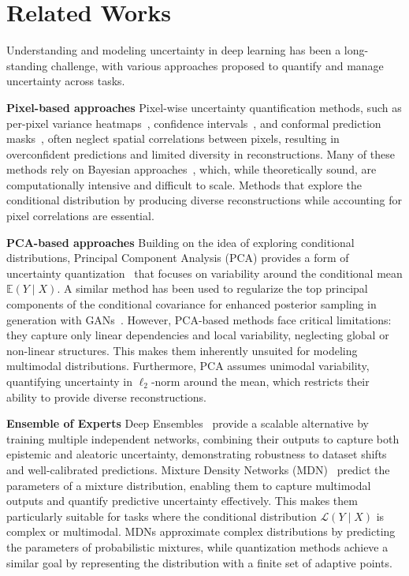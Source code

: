 \section{Related Works}
Understanding and modeling uncertainty in deep learning has been a long-standing challenge, with various approaches proposed to quantify and manage uncertainty across tasks.

\textbf{Pixel-based approaches}
Pixel-wise uncertainty quantification methods, such as per-pixel variance heatmaps~\citep{kendall2017uncertainties}, confidence intervals~\citep{angelopoulos2022image}, and conformal prediction masks~\citep{kutiel2023conformal}, often neglect spatial correlations between pixels, resulting in overconfident predictions and limited diversity in reconstructions. Many of these methods rely on Bayesian approaches~\cite {gal2016dropout, blundell2015weight}, which, while theoretically sound, are computationally intensive and difficult to scale. Methods that explore the conditional distribution by producing diverse reconstructions while accounting for pixel correlations are essential.

\textbf{PCA-based approaches}
Building on the idea of exploring conditional distributions, Principal Component Analysis (PCA) provides a form of uncertainty quantization~\citep{nehme2023uncertainty, manor2024posterior} that focuses on variability around the conditional mean \( \mathbb{E}(Y \mid X) \). A similar method has been used to regularize the top principal components of the conditional covariance for enhanced posterior sampling in generation with GANs~\citep{bendel2024pcagan}.
However, PCA-based methods face critical limitations: they capture only linear dependencies and local variability, neglecting global or non-linear structures.
This makes them inherently unsuited for modeling multimodal distributions. Furthermore, PCA assumes unimodal variability, quantifying uncertainty in \( \ell_2 \)-norm around the mean, which restricts their ability to provide diverse reconstructions.
%

\textbf{Ensemble of Experts}
Deep Ensembles~\citep{lakshminarayanan2017simple} provide a scalable alternative by training multiple independent networks, combining their outputs to capture both epistemic and aleatoric uncertainty, demonstrating robustness to dataset shifts and well-calibrated predictions.
Mixture Density Networks (MDN)~\citep{bishop1994mixture} predict the parameters of a mixture distribution, enabling them to capture multimodal outputs and quantify predictive uncertainty effectively. This makes them particularly suitable for tasks where the conditional distribution \( \mathcal{L}(Y \mid X) \) is complex or multimodal.
MDNs approximate complex distributions by predicting the parameters of probabilistic mixtures, while quantization methods achieve a similar goal by representing the distribution with a finite set of adaptive points.


